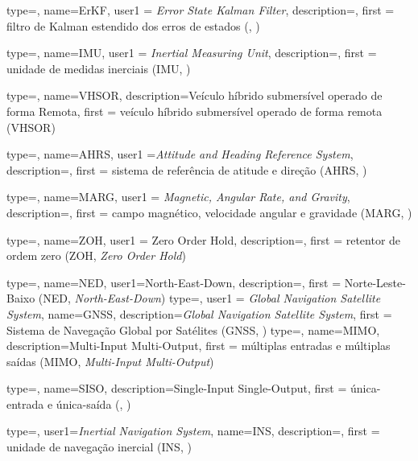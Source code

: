 {type=\acronymtype,
  name={ErKF},
  user1 = \emph{Error State Kalman Filter},
  description={},
  first = {filtro de Kalman estendido dos erros de estados (, )}
}

{type=\acronymtype,
  name={IMU},
  user1 = \emph{Inertial Measuring Unit},
  description={},
  first = {unidade de medidas inerciais (IMU, )}
}

{type=\acronymtype,
  name=VHSOR,
  description={Veículo híbrido submersível operado de forma Remota},
  first = {veículo híbrido submersível operado de forma remota (VHSOR)}
}

{type=\acronymtype,
  name={AHRS},
  user1 ={\emph{Attitude and Heading Reference System}},
  description={},
  first = {sistema de referência de atitude e direção (AHRS, )}
}

{type=\acronymtype,
  name={MARG},
  user1 = {\emph{Magnetic, Angular Rate, and Gravity}},
  description={},
  first = {campo magnético, velocidade angular e gravidade (MARG, )}
}


{type=\acronymtype,
  name={ZOH},
  user1 = {Zero Order Hold},
  description={\emph{}},
  first = {retentor de ordem zero (ZOH, \emph{Zero Order Hold})}
}

{type=\acronymtype,
  name={NED},
  user1={North-East-Down},
  description={\emph{}},
  first = {Norte-Leste-Baixo (NED, \emph{North-East-Down})}
}
{type=\acronymtype,
  user1 = {\emph{Global Navigation Satellite System}},
  name={GNSS},
  description=\emph{Global Navigation Satellite System},
  first = {Sistema de Navegação Global por Satélites (GNSS, )}
}
{type=\acronymtype,
  name={MIMO},
  description={Multi-Input Multi-Output},
  first = {múltiplas entradas e múltiplas saídas (MIMO, \emph{Multi-Input Multi-Output})}
}

{type=\acronymtype,
  name={SISO},
  description={Single-Input Single-Output},
  first = {única-entrada e única-saída (, )}
}

{type=\acronymtype,
  user1={\emph{Inertial Navigation System}},
  name={INS},
  description={},
  first = {unidade de navegação inercial (INS, )}
}

